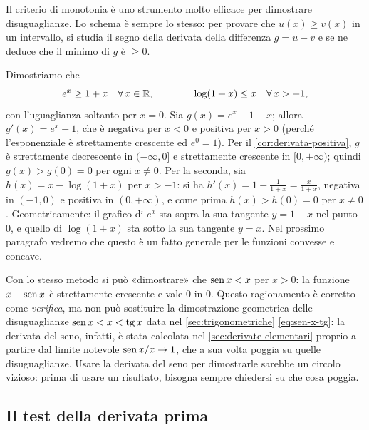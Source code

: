 Il criterio di monotonia è uno strumento molto efficace per dimostrare disuguaglianze.
Lo schema è sempre lo stesso: per provare che $u(x)\ge v(x)$ in un intervallo, si studia
il segno della derivata della differenza $g=u-v$ e se ne deduce che il minimo di $g$ è
$\ge0$.

\begin{esempio}\label{es:disuguaglianze-exp-log}
Dimostriamo che
\begin{equation}\label{eq:exp-log-disuguaglianze}
  e^{x}\ge1+x \quad\forall\, x\in\mathbb{R}, \qquad\qquad \log(1+x)\le x \quad\forall\, x>-1,
\end{equation}
con l'uguaglianza soltanto per $x=0$. Sia $g(x)=e^{x}-1-x$; allora $g'(x)=e^{x}-1$, che
è negativa per $x<0$ e positiva per $x>0$ (perché l'esponenziale è strettamente
crescente ed $e^{0}=1$). Per il \cref{cor:derivata-positiva}, $g$ è strettamente
decrescente in $(-\infty,0]$ e strettamente crescente in $[0,+\infty)$; quindi $g(x)>g(0)=0$
per ogni $x\neq0$. Per la seconda, sia $h(x)=x-\log(1+x)$ per $x>-1$: si ha
$h'(x)=1-\frac1{1+x}=\frac{x}{1+x}$, negativa in $(-1,0)$ e positiva in $(0,+\infty)$, e
come prima $h(x)>h(0)=0$ per $x\neq0$. Geometricamente: il grafico di $e^{x}$ sta sopra
la sua tangente $y=1+x$ nel punto $0$, e quello di $\log(1+x)$ sta sotto la sua tangente
$y=x$. Nel prossimo paragrafo vedremo che questo è un fatto generale per le funzioni
convesse e concave.
\end{esempio}

\begin{attenzione}
Con lo stesso metodo si può «dimostrare» che $\operatorname{sen} x<x$ per $x>0$: la funzione
$x-\operatorname{sen} x$ è strettamente crescente e vale $0$ in $0$. Questo ragionamento è corretto
come \emph{verifica}, ma non può sostituire la dimostrazione geometrica delle
disuguaglianze $\operatorname{sen} x<x<\operatorname{tg} x$ data nel \cref{sec:trigonometriche} \eqref{eq:sen-x-tg}:
la derivata del seno, infatti, è stata calcolata nel \cref{sec:derivate-elementari}
proprio a partire dal limite notevole $\operatorname{sen} x/x\to1$, che a sua volta poggia su quelle
disuguaglianze. Usare la derivata del seno per dimostrarle sarebbe un circolo vizioso:
prima di usare un risultato, bisogna sempre chiedersi su che cosa poggia.
\end{attenzione}

\subsection{Il test della derivata prima}

